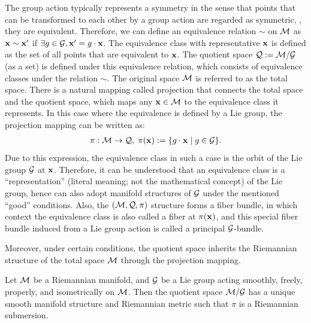 The group action typically represents a symmetry in the sense that points that can be transformed to each other by a group action are regarded as symmetric, \ie, they are equivalent.
Therefore, we can define an equivalence relation $\sim$ on $\mathcal{M}$ as $\mathbf{x} \sim \mathbf{x}'$ if $\exists g\in \mathcal{G}, \mathbf{x}' = g \cdot \mathbf{x}$. The equivalence class with representative $\mathbf{x}$ is defined as the set of all points that are equivalent to $\mathbf{x}$.
The quotient space $\mathcal{Q}:=\mathcal{M}/\mathcal{G}$ (as a set) is defined under this equivalence relation, which consists of equivalence classes under the relation $\sim$.
The original space $\mathcal{M}$ is referred to as the total space.
There is a natural mapping called projection that connects the total space and the quotient space, which maps any $\mathbf{x} \in \mathcal{M}$ to the equivalence class it represents. In this case where the equivalence is defined by a Lie group, the projection mapping can be written as:
\begin{align}
    \pi: \mathcal{M} \to \mathcal{Q}, \; \pi(\mathbf{x}) := \{ g \cdot \mathbf{x} \mid g \in \mathcal{G} \}.
\end{align}
Due to this expression, the equivalence class in such a case is the orbit of the Lie group $\mathcal{G}$ at $\mathbf{x}$. Therefore, it can be understood that an equivalence class is a ``representation'' (literal meaning; not the mathematical concept) of the Lie group, hence can also adopt manifold structures of $\mathcal{G}$ under the mentioned ``good'' conditions.
Also, the $(\mathcal{M}, \mathcal{Q}, \pi)$ structure forms a fiber bundle, in which context the equivalence class is also called a fiber at $\pi(\mathbf{x})$, and this special fiber bundle induced from a Lie group action is called a principal $\mathcal{G}$-bundle.

Moreover, under certain conditions, the quotient space inherits the Riemannian structure of the total space $\mathcal{M}$ through the projection mapping.


\begin{theorem}\label{thm:rie-submersion}
    \citep[Cor.~2.29]{lee2018introduction} Let $\mathcal{M}$ be a Riemannian manifold, and $\mathcal{G}$ be a Lie group acting smoothly, freely, properly, and isometrically on $\mathcal{M}$. Then the quotient space $\mathcal{M}/\mathcal{G}$ has a unique smooth manifold structure and Riemannian metric such that $\pi$ is a Riemannian submersion.
\end{theorem}

